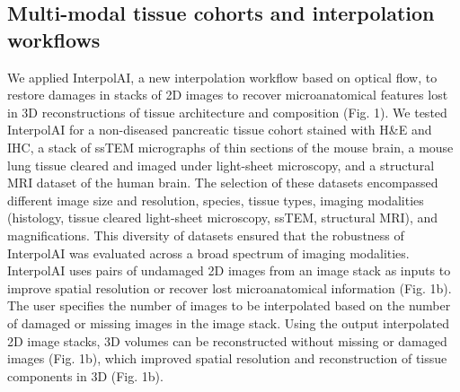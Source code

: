 \begin{refsection}
    \section{Multi-modal tissue cohorts and interpolation workflows}
    We applied InterpolAI, a new interpolation workflow based on optical flow, to restore damages in stacks of 2D images to recover microanatomical features lost in 3D reconstructions of tissue architecture and composition (Fig. 1)\cite{li2023a}. We tested InterpolAI for a non-diseased pancreatic tissue cohort stained with H\&E and IHC, a stack of ssTEM micrographs of thin sections of the mouse brain, a mouse lung tissue cleared and imaged under light-sheet microscopy, and a structural MRI dataset of the human brain. The selection of these datasets encompassed different image size and resolution, species, tissue types, imaging modalities (histology, tissue cleared light-sheet microscopy, ssTEM, structural MRI), and magnifications. This diversity of datasets ensured that the robustness of InterpolAI was evaluated across a broad spectrum of imaging modalities.
    InterpolAI uses pairs of undamaged 2D images from an image stack as inputs to improve spatial resolution or recover lost microanatomical information (Fig. 1b). The user specifies the number of images to be interpolated based on the number of damaged or missing images in the image stack. Using the output interpolated 2D image stacks, 3D volumes can be reconstructed without missing or damaged images (Fig. 1b), which improved spatial resolution and reconstruction of tissue components in 3D (Fig. 1b). 


\end{refsection}
